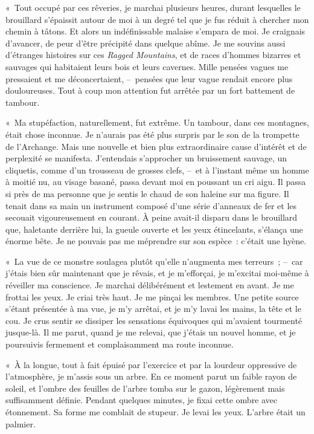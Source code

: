 \documentclass[french,twoside]{book} %
\begin{document}
« Tout occupé par ces rêveries, je marchai plusieurs heures, durant lesquelles le brouillard s’épaissit autour de moi à un degré tel que je fus réduit à chercher mon chemin à tâtons. Et alors un indéfinissable malaise s’empara de moi. Je craignais d’avancer, de peur d’être précipité dans quelque abîme. Je me souvins aussi d’étranges histoires sur ces \emph{Ragged Mountains}, et de races d’hommes bizarres et sauvages qui habitaient leurs bois et leurs cavernes. Mille pensées vagues me pressaient et me déconcertaient, – pensées que leur vague rendait encore plus douloureuses. Tout à coup mon attention fut arrêtée par un fort battement de tambour.\par
« Ma stupéfaction, naturellement, fut extrême. Un tambour, dans ces montagnes, était chose inconnue. Je n’aurais pas été plus surpris par le son de la trompette de l’Archange. Mais une nouvelle et bien plus extraordinaire cause d’intérêt et de perplexité se manifesta. J’entendais s’approcher un bruissement sauvage, un cliquetis, comme d’un trousseau de grosses clefs, – et à l’instant même un homme à moitié nu, au visage basané, passa devant moi en poussant un cri aigu. Il passa si près de ma personne que je sentis le chaud de son haleine sur ma figure. Il tenait dans sa main un instrument composé d’une série d’anneaux de fer et les secouait vigoureusement en courant. À peine avait-il disparu dans le brouillard que, haletante derrière lui, la gueule ouverte et les yeux étincelants, s’élança une énorme bête. Je ne pouvais pas me méprendre sur son espèce : c’était une hyène.\par
« La vue de ce monstre soulagea plutôt qu’elle n’augmenta mes terreurs ; – car j’étais bien sûr maintenant que je rêvais, et je m’efforçai, je m’excitai moi-même à réveiller ma conscience. Je marchai délibérément et lestement en avant. Je me frottai les yeux. Je criai très haut. Je me pinçai les membres. Une petite source s’étant présentée à ma vue, je m’y arrêtai, et je m’y lavai les mains, la tête et le cou. Je crus sentir se dissiper les sensations équivoques qui m’avaient tourmenté jusque-là. Il me parut, quand je me relevai, que j’étais un nouvel homme, et je poursuivis fermement et complaisamment ma route inconnue.\par
« À la longue, tout à fait épuisé par l’exercice et par la lourdeur oppressive de l’atmosphère, je m’assis sous un arbre. En ce moment parut un faible rayon de soleil, et l’ombre des feuilles de l’arbre tomba sur le gazon, légèrement mais suffisamment définie. Pendant quelques minutes, je fixai cette ombre avec étonnement. Sa forme me comblait de stupeur. Je levai les yeux. L’arbre était un palmier.\par
\end{document}
